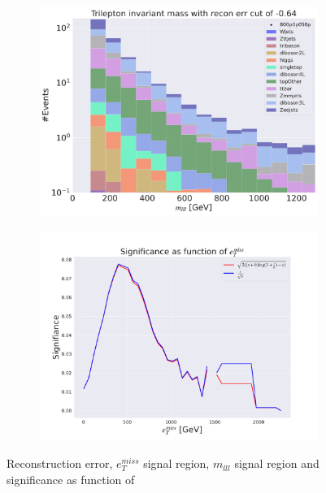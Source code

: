 \begin{figure}[H]
    \hfill
    \begin{subfigure}{.40\textwidth}
        \includegraphics[width=\textwidth]{Figures/AE_testing/big/3lep/b_data_recon_big_rm3_feats_sig_800p0p050p_mlll_recon_errcut_-0.64.pdf}
        \caption{}
        \label{fig:AE_3lep_big_mlll_800_3}
    \end{subfigure}
    \hfill   
    \begin{subfigure}{.40\textwidth}
        \includegraphics[width=\textwidth]{Figures/AE_testing/big/3lep/significance_etmiss_800p0p050p_-0.6363296281507171.pdf}
        \caption{}
        \label{fig:AE_3lep_big_signi_800_3}
    \end{subfigure}
    \hfill      
    \caption[3lep deep network | $800p50$ | AE | 3]{Reconstruction error, $e_T^{miss}$ signal region, $m_{lll}$ signal region and significance as function of 
}
\end{figure}

